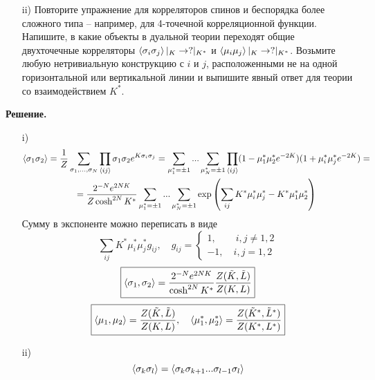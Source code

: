 \documentclass[12pt]{article}
\theoremstyle{definition}
\begin{document}
\begin{enumerate}
\begin{itemize}
        \item[ii)] Повторите упражнение для корреляторов спинов и беспорядка более сложного типа -- например, для 4-точечной корреляционной функции.\\
        Напишите, в какие объекты в дуальной теории переходят общие двухточечные корреляторы $\braket{\sigma_i\sigma_j}|_K\rightarrow?|_{K^*}$ и
        $\braket{\mu_i\mu_j}|_K\rightarrow?|_{K^*}$. Возьмите любую нетривиальную конструкцию с $i$ и $j$, расположенными не на одной горизонтальной или вертикальной линии и выпишите явный ответ для теории со взаимодействием $K^*$.
    \end{itemize}
    \textbf{Решение.}
    \begin{itemize}
        \item[i)]
        \begin{multline}
            \braket{\sigma_1\sigma_2}=\frac{1}{Z}\sum\limits_{\sigma_1,...,\sigma_N}\prod_{\braket{ij}}\sigma_1\sigma_2e^{K\sigma_i\sigma_j}=\sum\limits_{\mu^*_1=\pm1}...\sum\limits_{\mu^*_N=\pm1}\prod_{\braket{ij}}(1-\mu^*_1\mu^*_2e^{-2K})(1+\mu^*_i\mu^*_je^{-2K})=\\=\frac{2^{-N}e^{2NK}}{Z\cosh^{2N}K^*}\sum\limits_{\mu^*_1=\pm1}...\sum\limits_{\mu^*_N=\pm1}\exp\left(\sum\limits_{ij}K^*\mu^*_i\mu^*_j-K^*\mu^*_1\mu^*_2\right)
        \end{multline}
        Сумму в экспоненте можно переписать в виде
        \begin{equation}
            \sum\limits_{ij}K^*\mu^*_i\mu^*_jg_{ij},\quad g_{ij}=\begin{cases}
                1,\quad\quad i,j\neq1,2\\
                -1,\quad i,j=1,2
            \end{cases}
        \end{equation}
        \begin{equation}
            \boxed{\braket{\sigma_1,\sigma_2}=\frac{2^{-N}e^{2NK}}{\cosh^{2N}K^*}\frac{Z(\tilde K,\tilde L)}{Z(K,L)}}
        \end{equation}
        \begin{equation}
            \boxed{\braket{\mu_1,\mu_2}=\frac{Z(\tilde K,\tilde L)}{Z(K,L)},\quad\braket{\mu^*_1,\mu^*_2}=\frac{Z(\tilde K^*,\tilde L^*)}{Z(K^*,L^*)}}
        \end{equation}
        \item[ii)]
        \begin{equation}
            \braket{\sigma_k\sigma_l}=\braket{\sigma_k\sigma_{k+1}...\sigma_{l-1}\sigma_l}

\end{equation}
\end{itemize}
\end{enumerate}
\end{document}
